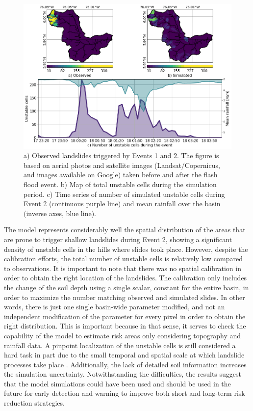 \documentclass[hess, manuscript]{copernicus}
\begin{document}
\begin{figure}[t!]
\centering
 \includegraphics[width=12cm]{Figures/Slides_byHills.png}
 \caption{a)  Observed landslides triggered by Events 1 and 2. The figure is based on aerial photos and satellite images (Landsat/Copernicus, and images available on Google) taken before and after the flash flood event.  b) Map of total unstable cells during the simulation period. c) Time series of number of simulated unstable cells during Event 2 (continuous purple line) and mean rainfall over the basin (inverse axes, blue line).}
    \label{fig:SlidesComparison}
\end{figure}

The model represents considerably well the spatial distribution of the areas that are prone to trigger shallow landslides during Event 2, showing a significant density of unstable cells in the hills where slides took place. However, despite the calibration efforts, the total number of unstable cells is relatively low compared to observations. It is important to note that there was no spatial calibration in order to obtain the right location of the landslides. The calibration only includes the change of the soil depth using a single scalar, constant for the entire basin, in order to maximize the number matching observed and simulated slides. In other words, there is just one single basin-wide parameter modified, and not an independent modification of the parameter for every pixel in order to obtain the right distribution.  This is important because in that sense, it serves to check the capability of the model to estimate risk areas only considering  topography and rainfall data. A pinpoint localization of the unstable cells is still considered a hard task in part due to the small temporal and spatial scale at which landslide processes take place \citep{Aristizabal2016, Dhakal2004, Wu1995}. Additionally,  the lack of detailed soil information increases the simulation uncertainty. Notwithstanding the difficulties, the results suggest that the model simulations could have been used and should be used in the future for early detection and warning to improve both short and long-term risk reduction strategies.\\
\end{document}
